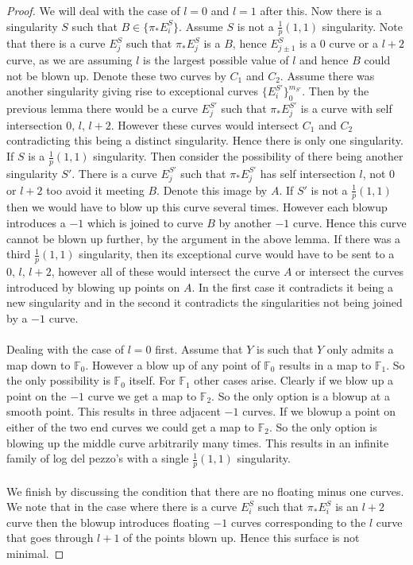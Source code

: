 \documentclass[11pt]{report}
\theoremstyle{definition}
\theoremstyle{definition}
\theoremstyle{definition}
\theoremstyle{definition}
\theoremstyle{definition}
\theoremstyle{definition}
\theoremstyle{definition}
\theoremstyle{definition}
\newcommand{\ldp}{log del pezzo}
\newcommand{\mb}[1]{\mathbb{#1}}
\begin{document}
\begin{proof}
We will deal with the case of $l = 0$ and $l = 1$ after this. Now there is a singularity $S$ such that $B \in \{ \pi_*E_i^S \}$. Assume $S$ is not a $\frac{1}{p}(1,1)$ singularity. Note that there is a curve $E_j^S$ such that $\pi_* E_j^S$ is a $B$, hence $E_{j\pm 1}^S$ is a $0$ curve or a $l+2$ curve, as we are assuming $l$ is the largest possible value of $l$ and hence $B$ could not be blown up. Denote these two curves by $C_1$ and $C_2$. Assume there was another singularity giving rise to exceptional curves $\{ E_i^{S'} \}_{0}^{m_{S'}} $. Then by the previous lemma there would be a curve $E_j^{S'}$ such that $\pi_* E_j^{S'}$ is a curve with self intersection $0, \,  l,\,  l+2$. However these curves would intersect $C_1$ and $C_2$ contradicting this being a distinct singularity. Hence there is only one singularity. If $S$ is a $\frac{1}{p}(1,1)$ singularity. Then consider the possibility of there being another singularity $S'$. There is a curve $E_j^{S'}$ such that $\pi_* E_j^{S'}$ has self intersection $l$, not $0$ or $l+2$ too avoid it meeting $B$. Denote this image by $A$. If $S'$ is not a $\frac{1}{p}(1,1)$ then we would have to blow up this curve several times. However each blowup introduces a $-1$ which is joined to curve $B$ by another $-1$ curve. Hence this curve cannot be blown up further, by the argument in the above lemma. If there was a third $\frac{1}{p}(1,1)$ singularity, then its exceptional curve would have to be sent to a $0, \, l, \, l+2$, however all of these would intersect the curve $A$ or intersect the curves introduced by blowing up points on $A$. In the first case it contradicts it being a new singularity and in the second it contradicts the singularities not being joined by a $-1$ curve.
\\
\\
Dealing with the case of $l = 0$ first. Assume that $Y$ is such that $Y$ only admits a map down to $\mb{F}_0$. However a blow up of any point of $\mb{F}_0$ results in a map to $\mb{F}_1$. So the only possibility is $\mb{F}_0$ itself. For $\mb{F}_1$ other cases arise. Clearly if we blow up a point on the $-1$ curve we get a map to $\mb{F}_2$. So the only option is a blowup at a smooth point. This results in three adjacent $-1$ curves. If we blowup a point on either of the two end curves we could get a map to $\mb{F}_2$. So the only option is blowing up the middle curve arbitrarily many times. This results in an infinite family of \ldp's with a single $\frac{1}{p}(1,1)$ singularity. 
\\
\\
We finish by discussing the condition that there are no floating minus one curves. We note that in the case where there is a curve $E_i^S$ such that $\pi_* E_i^S$ is an $l+2$ curve then the blowup introduces floating $-1$ curves corresponding to the $l$ curve that goes through $l+1$ of the points blown up. Hence this surface is not minimal.
\end{proof}
\end{document}
